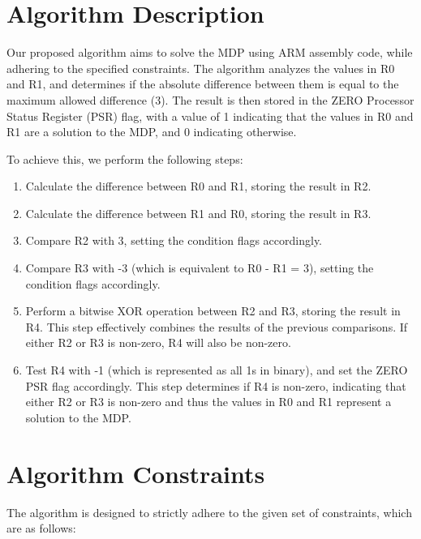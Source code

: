\section{Algorithm Description}
Our proposed algorithm aims to solve the MDP using ARM assembly code, while adhering to the specified constraints. The algorithm analyzes the values in R0 and R1, and determines if the absolute difference between them is equal to the maximum allowed difference (3). The result is then stored in the ZERO Processor Status Register (PSR) flag, with a value of 1 indicating that the values in R0 and R1 are a solution to the MDP, and 0 indicating otherwise.

To achieve this, we perform the following steps:

\begin{enumerate}
    \item Calculate the difference between R0 and R1, storing the result in R2.
    \item Calculate the difference between R1 and R0, storing the result in R3.
    \item Compare R2 with 3, setting the condition flags accordingly.
    \item Compare R3 with -3 (which is equivalent to R0 - R1 = 3), setting the condition flags accordingly.
    \item Perform a bitwise XOR operation between R2 and R3, storing the result in R4. This step effectively combines the results of the previous comparisons. If either R2 or R3 is non-zero, R4 will also be non-zero.
    \item Test R4 with -1 (which is represented as all 1s in binary), and set the ZERO PSR flag accordingly. This step determines if R4 is non-zero, indicating that either R2 or R3 is non-zero and thus the values in R0 and R1 represent a solution to the MDP.
\end{enumerate}

\section{Algorithm Constraints}
The algorithm is designed to strictly adhere to the given set of constraints, which are as follows:

